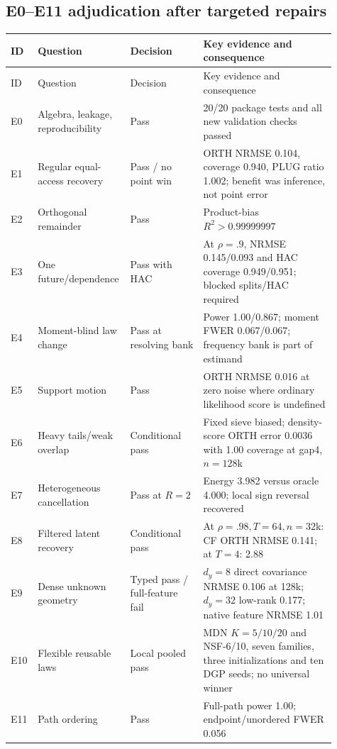\documentclass[10pt]{article}
\begin{document}
\subsection{E0--E11 adjudication after targeted repairs}

\begin{longtable}{L{0.07\linewidth}L{0.22\linewidth}L{0.22\linewidth}L{0.40\linewidth}}
\toprule
ID & Question & Decision & Key evidence and consequence \\
\midrule
\endfirsthead
\toprule ID & Question & Decision & Key evidence and consequence \\
\midrule\endhead
E0 & Algebra, leakage, reproducibility & Pass & 20/20 package tests and all new validation checks passed \\
E1 & Regular equal-access recovery & Pass / no point win & ORTH NRMSE 0.104, coverage 0.940, PLUG ratio 1.002; benefit was inference, not point error \\
E2 & Orthogonal remainder & Pass & Product-bias $R^2>0.99999997$ \\
E3 & One future/dependence & Pass with HAC & At $\rho=.9$, NRMSE 0.145/0.093 and HAC coverage 0.949/0.951; blocked splits/HAC required \\
E4 & Moment-blind law change & Pass at resolving bank & Power 1.00/0.867; moment FWER 0.067/0.067; frequency bank is part of estimand \\
E5 & Support motion & Pass & ORTH NRMSE 0.016 at zero noise where ordinary likelihood score is undefined \\
E6 & Heavy tails/weak overlap & Conditional pass & Fixed sieve biased; density-score ORTH error 0.0036 with 1.00 coverage at gap4, $n=128$k \\
E7 & Heterogeneous cancellation & Pass at $R=2$ & Energy 3.982 versus oracle 4.000; local sign reversal recovered \\
E8 & Filtered latent recovery & Conditional pass & At $\rho=.98,T=64,n=32$k: CF ORTH NRMSE 0.141; at $T=4$: 2.88 \\
E9 & Dense unknown geometry & Typed pass / full-feature fail & $d_y=8$ direct covariance NRMSE 0.106 at 128k; $d_y=32$ low-rank 0.177; native feature NRMSE 1.01 \\
E10 & Flexible reusable laws & Local pooled pass & MDN $K=5/10/20$ and NSF-6/10, seven families, three initializations and ten DGP seeds; no universal winner \\
E11 & Path ordering & Pass & Full-path power 1.00; endpoint/unordered FWER 0.056 \\
\bottomrule
\end{longtable}
\end{document}
